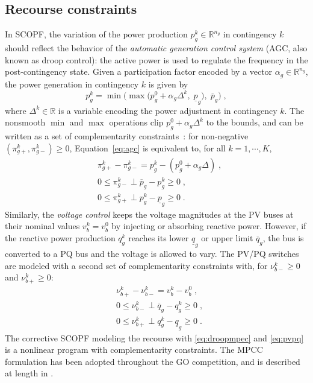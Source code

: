 \documentclass{IEEEtran4PSCC}
\begin{document}
\subsection{Recourse constraints}
In SCOPF, the variation of the power production $p_g^k \in \mathbb{R}^{n_g}$ in contingency $k$
should reflect the behavior of the \emph{automatic generation control system}
(AGC, also known as droop control): the active power is used to regulate the
frequency in the post-contingency state. Given a participation factor
encoded by a vector $\alpha_g \in \mathbb{R}^{n_g}$, the power generation in contingency $k$ is given by
\begin{equation}
  \label{eq:agc}
  p_g^k = \min\Big(\max\big( p_g^0 + \alpha_g \Delta^k , \; \underline{p}_g \big), \; \overline{p}_g \Big) \; ,
\end{equation}
where $\Delta^k \in \mathbb{R}$ is a variable encoding the power adjustment in contingency $k$.
The nonsmooth $\min$ and $\max$ operations clip $p_g^0 + \alpha_g \Delta^k$ to the bounds, and can be written as
a set of complementarity constraints~\cite{baumrucker2008mpec}: for non-negative $(\pi_{g+}^k, \pi_{g-}^k) \geq 0$, Equation~\eqref{eq:agc} is equivalent to, for all $k=1, \cdots, K$,
\begin{equation}
  \label{eq:droopmpec}
  \begin{aligned}
    & \pi_{g+}^k - \pi_{g-}^k = p_{g}^k - (p_g^0 + \alpha_g \Delta) \; , \\
    & 0 \leq \pi_{g-}^k \perp \overline{p}_g - p_g^k \geq 0 \; , \\
    & 0 \leq \pi_{g+}^k \perp p_g^k - \underline{p}_g \geq 0 \; .
  \end{aligned}
\end{equation}
Similarly, the \emph{voltage control} keeps the voltage
magnitudes at the PV buses at their nominal values $v_{b}^k = v_{b}^0$ by injecting
or absorbing reactive power. However, if the reactive power production $q_g^k$ reaches
its lower $\underline{q}_g$ or upper limit $\overline{q}_g$, the bus is converted to a PQ bus and the voltage is allowed
to vary. The PV/PQ switches are modeled with a second set of complementarity constraints with,
for $\nu_{b-}^k \geq 0$ and $\nu_{b+}^k \geq 0$:
\begin{equation}
  \label{eq:pvpq}
  \begin{aligned}
    & \nu_{b+}^k - \nu_{b-}^k = v_b^k - v_b^0 \; ,\\
    & 0 \leq \nu_{b-}^k \perp \overline{q}_g - q_g^k \geq 0 \; , \\
    & 0 \leq \nu_{b+}^k \perp q_g^k - \underline{q}_g \geq 0 \; .
  \end{aligned}
\end{equation}
The corrective SCOPF modeling the recourse with \eqref{eq:droopmpec}
and \eqref{eq:pvpq} is a nonlinear program with complementarity
constraints. The MPCC formulation has been adopted throughout the GO
competition, and is described at length in \cite{aravena2023recent,curtis2023decomposition,gholami2023admm}.
\end{document}
